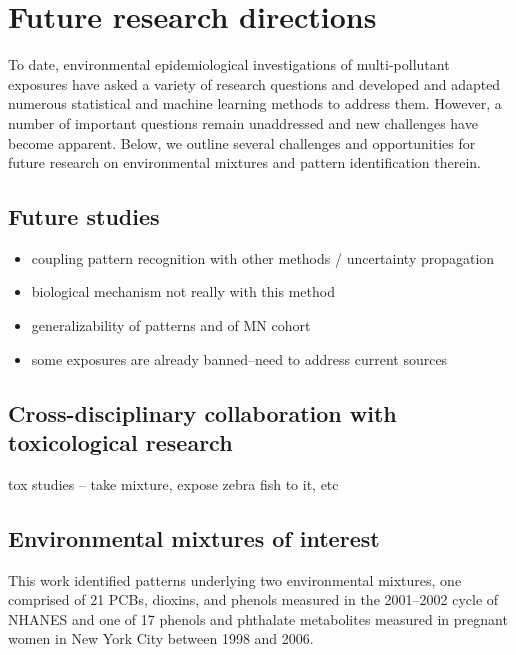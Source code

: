 \clearpage
\section{Future research directions}\label{sec:future}
To date, environmental epidemiological investigations of multi-pollutant exposures have asked a variety of research questions and developed and adapted numerous statistical and machine learning methods to address them. However, a number of important questions remain unaddressed and new challenges have become apparent. Below, we outline several challenges and opportunities for future research on environmental mixtures and pattern identification therein.

\subsection{Future studies}

\begin{itemize}
    \item coupling pattern recognition with other methods / uncertainty propagation
    \item biological mechanism not really with this method
    \item generalizability of patterns and of MN cohort
    \item some exposures are already banned--need to address current sources
\end{itemize}

\subsection{Cross-disciplinary collaboration with toxicological research}

tox studies -- take mixture, expose zebra fish to it, etc

\subsection{Environmental mixtures of interest}
This work identified patterns underlying two environmental mixtures, one comprised of 21 PCBs, dioxins, and phenols measured in the 2001--2002 cycle of NHANES and one of 17 phenols and phthalate metabolites measured in pregnant women in New York City between 1998 and 2006.

